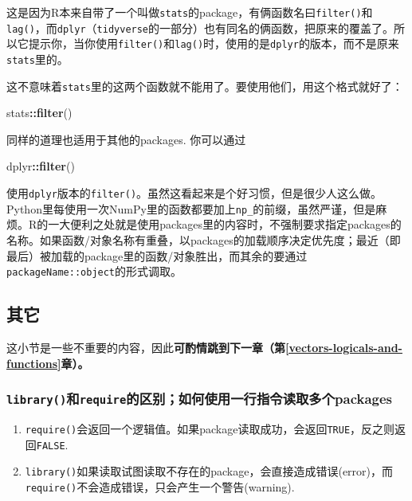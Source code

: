 \documentclass[]{book}
\newenvironment{Shaded}{\begin{snugshade}}{\end{snugshade}}
\newcommand{\KeywordTok}[1]{\textcolor[rgb]{0.13,0.29,0.53}{\textbf{#1}}}
\newcommand{\NormalTok}[1]{#1}
\newcommand{\OperatorTok}[1]{\textcolor[rgb]{0.81,0.36,0.00}{\textbf{#1}}}
\providecommand{\tightlist}{%
  \setlength{\itemsep}{0pt}\setlength{\parskip}{0pt}}
\begin{document}
这是因为R本来自带了一个叫做\texttt{stats}的package，有俩函数名曰\texttt{filter()}和\texttt{lag()}，而\texttt{dplyr}（\texttt{tidyverse}的一部分）也有同名的俩函数，把原来的覆盖了。所以它提示你，当你使用\texttt{filter()}和\texttt{lag()}时，使用的是\texttt{dplyr}的版本，而不是原来\texttt{stats}里的。

这不意味着\texttt{stats}里的这两个函数就不能用了。要使用他们，用这个格式就好了：

\begin{Shaded}
\begin{Highlighting}[]
\NormalTok{stats}\OperatorTok{::}\KeywordTok{filter}\NormalTok{()}
\end{Highlighting}
\end{Shaded}

同样的道理也适用于其他的packages. 你可以通过

\begin{Shaded}
\begin{Highlighting}[]
\NormalTok{dplyr}\OperatorTok{::}\KeywordTok{filter}\NormalTok{()}
\end{Highlighting}
\end{Shaded}

使用\texttt{dplyr}版本的\texttt{filter()}。虽然这看起来是个好习惯，但是很少人这么做。Python里每使用一次NumPy里的函数都要加上\texttt{np\_}的前缀，虽然严谨，但是麻烦。R的一大便利之处就是使用packages里的内容时，不强制要求指定packages的名称。如果函数/对象名称有重叠，以packages的加载顺序决定优先度；最近（即最后）被加载的package里的函数/对象胜出，而其余的要通过\texttt{packageName::object}的形式调取。

\hypertarget{package-misc}{%
\subsection{其它}\label{package-misc}}

这小节是一些不重要的内容，因此\textbf{可酌情跳到下一章（第\ref{vectors-logicals-and-functions}章）。}

\hypertarget{require-and-library}{%
\subsubsection{\texorpdfstring{\texttt{library()}和\texttt{require}的区别；如何使用一行指令读取多个packages}{library()和require的区别；如何使用一行指令读取多个packages}}\label{require-and-library}}

\begin{enumerate}
\def\labelenumi{\arabic{enumi}.}
\tightlist
\item
  \texttt{require()}会返回一个逻辑值。如果package读取成功，会返回\texttt{TRUE}，反之则返回\texttt{FALSE}.
\item
  \texttt{library()}如果读取试图读取不存在的package，会直接造成错误(error)，而\texttt{require()}不会造成错误，只会产生一个警告(warning).
\end{enumerate}
\end{document}
